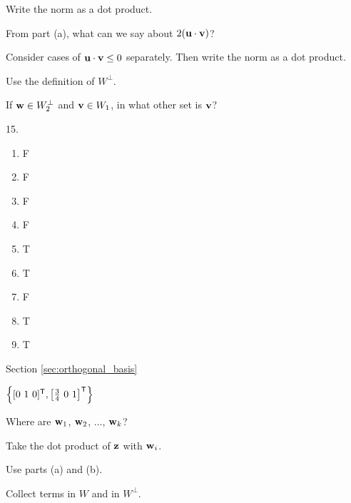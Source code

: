 \begin{multicols}{2}
\item \label{ex:Pyth_Thm} 
\ba	
\item Write the norm as a dot product. 

\item From part (a), what can we say about $2(\mathbf{u} \cdot \mathbf{v})$?  

\ea
	
\item Consider cases of $\mathbf{u} \cdot \mathbf{v} \leq 0$ separately. Then write the norm as a dot product. 

\item Use the definition of $W^\perp$. 

\item If $\mathbf{w} \in W_2^\perp$ and $\mathbf{v} \in W_1$, in what other set is $\mathbf{v}$? 

\oee

\be
\item[15.]
\begin{enumerate}[label=(\alph*), leftmargin=1\parindent]
	\item F
	\item F 
	\item F 
	\item F
	 \item T
	\item T
	\item F 
	\item T
	\item T
	\end{enumerate}
	
\ee



\hspace{-0.25in} Section \ref{sec:orthogonal_basis}
\obe
\item $\left\{ [0 \ 1 \ 0]^{\mathsf{T}}, \left[ \frac{3}{4} \ 0 \ 1\right]^{\mathsf{T}} \right\}$

\item \label{problem:orthog_decomp} 
\ba
\item Where are $\mathbf{w}_1$, $\mathbf{w}_2$, $\ldots$, $\mathbf{w}_k$? 

\item Take the dot product of $\mathbf{z}$ with $\mathbf{w}_i$. 

\item Use parts (a) and (b).

\item Collect terms in $W$ and in $W^{\perp}$. 


\end{multicols}

